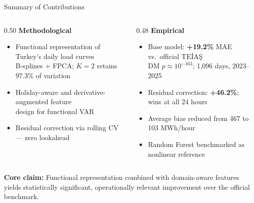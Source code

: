 \documentclass[10pt,aspectratio=169]{beamer}
\begin{document}
\begin{frame}{Summary of Contributions}
  \begin{columns}
    \begin{column}{0.50\textwidth}
      \textbf{Methodological}
      \vspace{0.3em}
      \begin{itemize}
        \item Functional representation of Turkey's daily load curves\\
              {\small B-splines + FPCA; $K=2$ retains 97.3\% of variation}
        \item Holiday-aware and derivative-augmented feature\\
              design for functional VAR
        \item Residual correction via rolling CV --- zero lookahead
      \end{itemize}
    \end{column}
    \begin{column}{0.48\textwidth}
      \textbf{Empirical}
      \vspace{0.3em}
      \begin{itemize}
        \item Base model: \textbf{+19.2\%} MAE vs.\ official TEİAŞ\\
              {\small DM $p \approx 10^{-163}$; 1,096 days, 2023--2025}
        \item Residual correction: \textbf{+46.2\%}; wins at all 24 hours
        \item Average bias reduced from 467 to 103 MWh/hour
        \item Random Forest benchmarked as nonlinear reference
      \end{itemize}
    \end{column}
  \end{columns}
  \vspace{0.6em}
  \begin{center}
    \small
    \textbf{Core claim:} Functional representation combined with domain-aware features\\
    yields statistically significant, operationally relevant improvement over the official benchmark.
  \end{center}
\end{frame}
\end{document}
